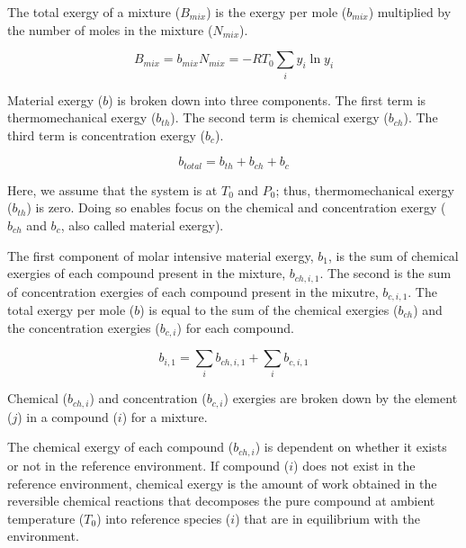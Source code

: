 \documentclass[energies,article,submit,pdftex,moreauthors]{Definitions/mdpi}
\begin{document}
The total exergy of a mixture ($B_{mix}$) is the exergy per mole ($b_{mix}$)
multiplied by the number of moles
in the mixture ($N_{mix}$).

\begin{equation}\label{eq:specific_exergy_of_mixture_definition2}
  B_{mix} = {b_{mix}}{N_{mix}} = -RT_{0}\sum_{i}y_{i}\ln{y_{i}}
\end{equation}

Material exergy ($b$) is broken down into three components.
The first term is thermomechanical exergy ($b_{th}$).
The second term is chemical exergy ($b_{ch}$).
The third term is concentration exergy ($b_{c}$).

\begin{equation}\label{eq:general_material_exergy_definition}
 b_{total} = b_{th} + b_{ch} + b_{c}
\end{equation}

Here, we assume that the system is at
$T_{0}$ and $P_{0}$;
thus, thermomechanical exergy ($b_{th}$) is zero.
Doing so enables focus on the chemical and concentration exergy
($b_{ch}$ and $b_{c}$, also called material exergy).

The first component of molar intensive material exergy, $b_{1}$,
is the sum of chemical exergies of each compound
present in the mixture, $b_{ch,i,1}$.
The second is the sum of concentration exergies of each compound
present in the mixutre, $b_{c,i,1}$.
The total exergy per mole ($b$) is equal to the sum of the chemical exergies ($b_{ch}$)
and the concentration exergies ($b_{c,i}$) for each compound.

\begin{equation}\label{eq:specific_molar_intensive_exergy_definition}
  b_{i,1} = \sum_{i}{b_{ch,i,1}} + \sum_{i}{b_{c,i,1}}
\end{equation}



Chemical ($b_{ch,i}$) and concentration ($b_{c,i}$) exergies are broken down
by the element ($j$) in a compound ($i$)
for a mixture.

The chemical exergy of each compound ($b_{ch,i}$) is dependent
on whether it exists or not
in the reference environment.
If compound ($i$) does not exist
in the reference environment,
chemical exergy is the amount of work obtained
in the reversible chemical reactions
that decomposes the pure compound at ambient temperature ($T_{0}$)
into reference species ($i$) that are in equilibrium
with the environment.
\end{document}
